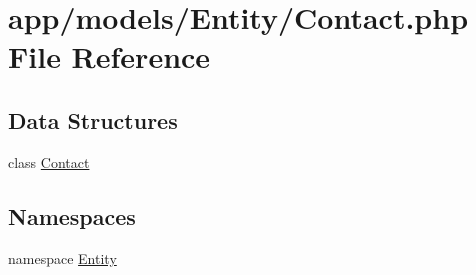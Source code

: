 \hypertarget{models_2_entity_2contact_8php}{\section{app/models/\-Entity/\-Contact.php File Reference}
\label{models_2_entity_2contact_8php}
}
\subsection*{Data Structures}
\begin{DoxyCompactItemize}
\item 
class \hyperlink{class_entity_1_1_contact}{Contact}
\end{DoxyCompactItemize}
\subsection*{Namespaces}
\begin{DoxyCompactItemize}
\item 
namespace \hyperlink{namespace_entity}{Entity}
\end{DoxyCompactItemize}
